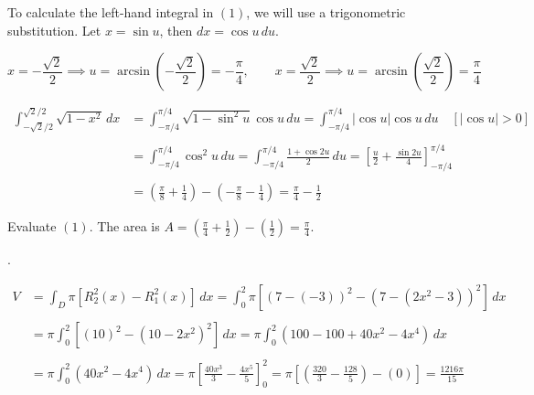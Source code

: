 \documentclass{article}
\begin{document}
\hfill

\noindent To calculate the left-hand integral in $(1)$, we will use a trigonometric substitution. Let $x=\sin u$, then $dx=\cos u\,du$.

\[x=-\frac{\sqrt2}2\implies u=\arcsin\left(-\frac{\sqrt2}2\right)=-\frac{\pi}4,\qquad x=\frac{\sqrt2}2\implies u=\arcsin\left(\frac{\sqrt2}2\right)=\frac{\pi}4\]

\begin{align*}\int_{-\sqrt2/2}^{\sqrt2/2}\sqrt{1-x^2}\,dx&=\int_{-\pi/4}^{\pi/4}\sqrt{1-\sin^2u}\cos u\,du=\int_{-\pi/4}^{\pi/4}\left|\cos u\right|\cos u\,du\quad\left[\left|\cos u\right|>0\right]\\\\&=\int_{-\pi/4}^{\pi/4}\cos^2u\,du=\int_{-\pi/4}^{\pi/4}\frac{1+\cos2u}{2}\,du=\left[\frac u2+\frac{\sin2u}4\right]_{-\pi/4}^{\pi/4}\\\\&=\left(\frac\pi8+\frac14\right)-\left(-\frac\pi8-\frac14\right)=\frac\pi4-\frac12\end{align*}

\hfill

\noindent Evaluate $(1)$. The area is $\displaystyle A=\left(\frac\pi4+\frac12\right)-\left(\frac12\right)=\boxed{\frac\pi4}$.

\newpage

.
\begin{center}
\end{center}
\begin{align*}
V&=\int_D\pi\left[R_2^2(x)-R_1^2(x)\right]\,dx=\int_0^2\pi\left[\left(7-(-3)\right)^2-\left(7-\left(2x^2-3\right)\right)^2\right]\,dx\\\\&=\pi\int_0^2\left[(10)^2-\left(10-2x^2\right)^2\right]\,dx=\pi\int_0^2\left(100-100+40x^2-4x^4\right)\,dx\\\\&=\pi\int_0^2\left(40x^2-4x^4\right)\,dx=\pi\left[\frac{40x^3}3-\frac{4x^5}5\right]_0^2=\pi\left[\left(\frac{320}3-\frac{128}5\right)-\left(0\right)\right]=\boxed{\frac{1216\pi}{15}}
\end{align*}
\end{document}
